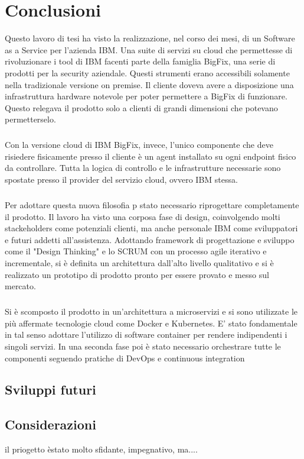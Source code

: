 \chapter{Conclusioni}

Questo lavoro di tesi ha visto la realizzazione, nel corso dei mesi, di un Software as a Service per l'azienda IBM. Una suite di servizi su cloud che permettesse di rivoluzionare i tool di IBM facenti parte della famiglia BigFix, una serie di prodotti per la security aziendale. Questi strumenti erano accessibili solamente nella tradizionale versione on premise. Il cliente doveva avere a disposizione una infrastruttura hardware notevole per poter permettere a BigFix di funzionare. Questo relegava il prodotto solo a clienti di grandi dimensioni che potevano permetterselo. 
\paragraph{}
Con la versione cloud di IBM BigFix, invece, l'unico componente che deve risiedere fisicamente presso il cliente è un agent installato su ogni endpoint fisico da controllare. Tutta la logica di controllo e le infrastrutture necessarie sono spostate presso il provider del servizio cloud, ovvero IBM stessa.

\paragraph{}
Per adottare questa nuova filosofia p stato necessario riprogettare completamente il prodotto. Il lavoro ha visto una corposa fase di design, coinvolgendo molti stackeholders come potenziali clienti, ma anche personale IBM come sviluppatori e futuri addetti all'assistenza. Adottando framework di progettazione e sviluppo come il "Design Thinking" e lo SCRUM con un processo agile iterativo e incrementale, si è definita un architettura dall'alto livello qualitativo e si è realizzato un prototipo di prodotto pronto per essere provato e messo sul mercato.
\paragraph{}
Si è scomposto il prodotto in un'architettura a microservizi e si sono utilizzate le più affermate tecnologie cloud come Docker e Kubernetes. E' stato fondamentale in tal senso adottare l'utilizzo di software container per rendere indipendenti i singoli servizi. In una seconda fase poi è stato necessario orchestrare tutte le componenti seguendo pratiche di DevOps e continuous integration
\section{Sviluppi futuri}
\section{Considerazioni}

il priogetto èstato molto sfidante, impegnativo, ma....
